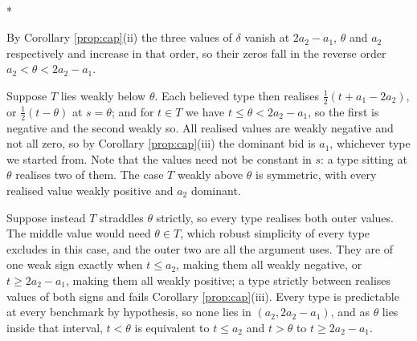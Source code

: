 \documentclass[12pt]{article}
\makeatletter
\theoremstyle{definition}
\renewenvironment{proof}[1][\proofname]{\par
  \pushQED{\qed}%
  \normalfont \topsep6\p@\@plus6\p@\relax
  \trivlist
  \item[\hskip\labelsep\itshape #1\@addpunct{.}]\mbox{}\\*
  \ignorespaces
}{%
  \popQED\endtrivlist\@endpefalse
}
\makeatother
\begin{document}
\begin{proof}[Proof of Corollary \ref{cor:sepool}]
By Corollary \ref{prop:cap}(ii) the three values of $\delta$ vanish at $2a_2 - a_1$, $\theta$ and $a_2$ respectively and increase in that order, so their zeros fall in the reverse order $a_2 < \theta < 2a_2 - a_1$.

Suppose $T$ lies weakly below $\theta$. Each believed type then realises $\tfrac12(t + a_1 - 2a_2)$, or $\tfrac12(t - \theta)$ at $s = \theta$; and for $t \in T$ we have $t \le \theta < 2a_2 - a_1$, so the first is negative and the second weakly so. All realised values are weakly negative and not all zero, so by Corollary \ref{prop:cap}(iii) the dominant bid is $a_1$, whichever type we started from. Note that the values need not be constant in $s$: a type sitting at $\theta$ realises two of them. The case $T$ weakly above $\theta$ is symmetric, with every realised value weakly positive and $a_2$ dominant.

Suppose instead $T$ straddles $\theta$ strictly, so every type realises both outer values. The middle value would need $\theta \in T$, which robust simplicity of every type excludes in this case, and the outer two are all the argument uses. They are of one weak sign exactly when $t \le a_2$, making them all weakly negative, or $t \ge 2a_2 - a_1$, making them all weakly positive; a type strictly between realises values of both signs and fails Corollary \ref{prop:cap}(iii). Every type is predictable at every benchmark by hypothesis, so none lies in $(a_2, 2a_2 - a_1)$, and as $\theta$ lies inside that interval, $t < \theta$ is equivalent to $t \le a_2$ and $t > \theta$ to $t \ge 2a_2 - a_1$.
\end{proof}
\end{document}
